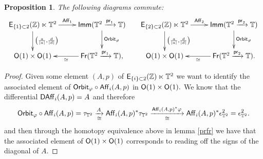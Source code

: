 \documentclass{amsart}
\newtheorem{prop}[theorem]{Proposition}
\theoremstyle{definition}
\theoremstyle{remark}
\DeclareMathOperator{\pr}{\mathsf{pr}}
\newcommand{\xra}{\xrightarrow}
\DeclareMathOperator{\Fr}{\sf Fr}
\DeclareMathOperator{\Imm}{\sf Imm}
\begin{document}
\begin{prop} \label{p45}
The following diagrams commute:
\[
\xymatrix{
{\sf E}_{\{1\} \subset 2}(\ZZ) \ltimes \TT^{2} \ar[r]^-{ {\sf Aff}_{1}}
\ar[d]^{\left(\frac{a}{|a|}, \frac{d}{|d|}\right)} 
&
\Imm(\TT^2 \xra{\pr_1} \TT) \ar[d]^-{{\sf Orbit}_{\varphi}} 
\\
{\sf O}(1) \times {\sf O}(1) 
&
\Fr(\TT^2 \xra{\pr_1} \TT) \ar@(-,-)[l]^-{\simeq},
}
\hspace{15pt}
\xymatrix{
{\sf E}_{\{2\} \subset 2}(\ZZ) \ltimes \TT^{2} \ar[r]^-{ {\sf Aff}_{2}}
\ar[d]^{\left(\frac{a}{|a|}, \frac{d}{|d|}\right)} 
&
\Imm(\TT^2 \xra{\pr_2} \TT) \ar[d]^-{{\sf Orbit}_{\varphi}} 
\\
{\sf O}(1) \times {\sf O}(1) 
&
\Fr(\TT^2 \xra{\pr_2} \TT) \ar@(-,-)[l]^-{\simeq}.
}
\]
\end{prop} 
\begin{proof}
Given some element $(A, p)$ of ${\sf E}_{\{i\} \subset 2}(\mathbb Z) \ltimes \mathbb T^{2}$ we want to identify the associated element of ${\sf Orbit}_{\varphi} \circ {\sf Aff}_{i}(A, p)$ in ${\sf O}(1) \times {\sf O}(1).$ We know that the differential ${\sf D Aff}_{i}(A, p) = A$ and therefore
\[
{\sf Orbit}_{\varphi} \circ {\sf Aff}_{i}(A, p) = \tau_{\TT^2} 
\underset{\cong}{\xra{A}}
{\sf Aff}_{i}(A, p)^\ast \tau_{\TT^2}
\underset{\cong}{ \xra{{\sf Aff}_{i}(A, p)^\ast \varphi} }
{\sf Aff}_{i}(A, p)^\ast \epsilon^2_{\TT^2}
=
\epsilon^2_{\TT^2}.
\]
and then through the homotopy equivalence above in lemma \ref{prfr} we have that the associated element of ${\sf O}(1) \times {\sf O}(1)$ corresponds to reading off the signs of the diagonal of $A.$
\end{proof}
\end{document}
